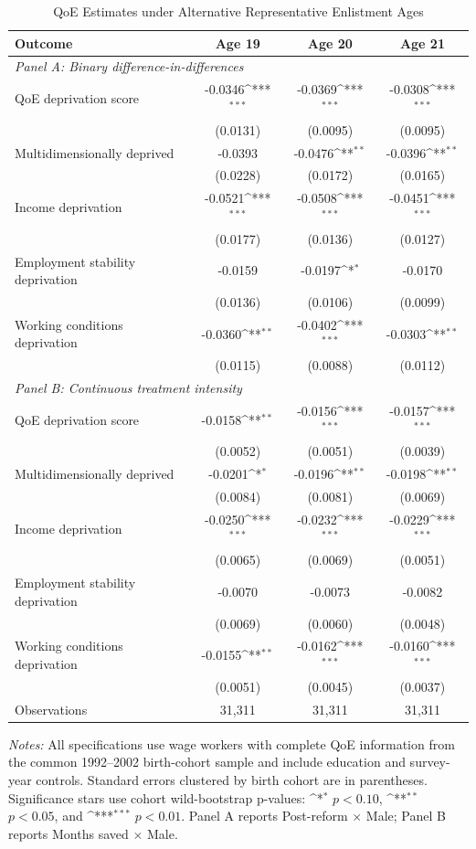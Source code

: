 \begin{table}[!htbp]
\centering
\def\sym#1{\ifmmode^{#1}\else\(^{#1}\)\fi}
\caption{QoE Estimates under Alternative Representative Enlistment Ages}
\label{tab:enlistage_qoe_composite}
\begin{tabular}{lccc}
\toprule
Outcome & Age 19 & Age 20 & Age 21 \\
\midrule
\multicolumn{4}{l}{\textit{Panel A: Binary difference-in-differences}} \\
QoE deprivation score & -0.0346\sym{***} & -0.0369\sym{***} & -0.0308\sym{***} \\
 & (0.0131) & (0.0095) & (0.0095) \\
Multidimensionally deprived & -0.0393 & -0.0476\sym{**} & -0.0396\sym{**} \\
 & (0.0228) & (0.0172) & (0.0165) \\
Income deprivation & -0.0521\sym{***} & -0.0508\sym{***} & -0.0451\sym{***} \\
 & (0.0177) & (0.0136) & (0.0127) \\
Employment stability deprivation & -0.0159 & -0.0197\sym{*} & -0.0170 \\
 & (0.0136) & (0.0106) & (0.0099) \\
Working conditions deprivation & -0.0360\sym{**} & -0.0402\sym{***} & -0.0303\sym{**} \\
 & (0.0115) & (0.0088) & (0.0112) \\
\midrule
\multicolumn{4}{l}{\textit{Panel B: Continuous treatment intensity}} \\
QoE deprivation score & -0.0158\sym{**} & -0.0156\sym{***} & -0.0157\sym{***} \\
 & (0.0052) & (0.0051) & (0.0039) \\
Multidimensionally deprived & -0.0201\sym{*} & -0.0196\sym{**} & -0.0198\sym{**} \\
 & (0.0084) & (0.0081) & (0.0069) \\
Income deprivation & -0.0250\sym{***} & -0.0232\sym{***} & -0.0229\sym{***} \\
 & (0.0065) & (0.0069) & (0.0051) \\
Employment stability deprivation & -0.0070 & -0.0073 & -0.0082 \\
 & (0.0069) & (0.0060) & (0.0048) \\
Working conditions deprivation & -0.0155\sym{**} & -0.0162\sym{***} & -0.0160\sym{***} \\
 & (0.0051) & (0.0045) & (0.0037) \\
\midrule
Observations & 31,311 & 31,311 & 31,311 \\
\bottomrule
\end{tabular}
\begin{minipage}{0.96\linewidth}
\footnotesize \textit{Notes:} All specifications use wage workers with complete QoE information from the common 1992--2002 birth-cohort sample and include education and survey-year controls. Standard errors clustered by birth cohort are in parentheses. Significance stars use cohort wild-bootstrap p-values: \sym{*} \(p<0.10\), \sym{**} \(p<0.05\), and \sym{***} \(p<0.01\). Panel A reports Post-reform \(\times\) Male; Panel B reports Months saved \(\times\) Male.
\end{minipage}
\end{table}
